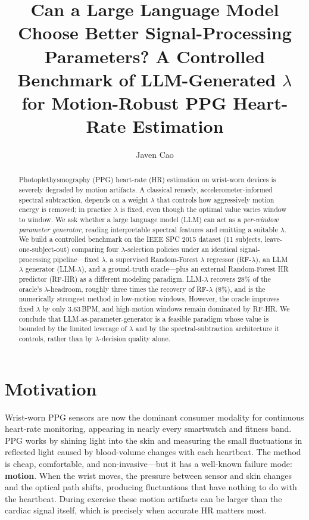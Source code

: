 \documentclass[sigconf,nonacm,11pt]{acmart}
\title{Can a Large Language Model Choose Better Signal-Processing Parameters? A Controlled Benchmark of LLM-Generated $\lambda$ for Motion-Robust PPG Heart-Rate Estimation}
\author{Javen Cao}
\affiliation{%
  \institution{University of California, San Diego}
  \city{La Jolla}
  \state{California}
  \country{USA}
}
\begin{document}
\begin{abstract}
Photoplethysmography (PPG) heart-rate (HR) estimation on wrist-worn devices is severely degraded by motion artifacts. A classical remedy, accelerometer-informed spectral subtraction, depends on a weight $\lambda$ that controls how aggressively motion energy is removed; in practice $\lambda$ is fixed, even though the optimal value varies window to window. We ask whether a large language model (LLM) can act as a \emph{per-window parameter generator}, reading interpretable spectral features and emitting a suitable $\lambda$. We build a controlled benchmark on the IEEE SPC 2015 dataset (11 subjects, leave-one-subject-out) comparing four $\lambda$-selection policies under an identical signal-processing pipeline---fixed $\lambda$, a supervised Random-Forest $\lambda$ regressor (RF-$\lambda$), an LLM $\lambda$ generator (LLM-$\lambda$), and a ground-truth oracle---plus an external Random-Forest HR predictor (RF-HR) as a different modeling paradigm. LLM-$\lambda$ recovers 28\% of the oracle's $\lambda$-headroom, roughly three times the recovery of RF-$\lambda$ (8\%), and is the numerically strongest method in low-motion windows. However, the oracle improves fixed $\lambda$ by only 3.63\,BPM, and high-motion windows remain dominated by RF-HR. We conclude that LLM-as-parameter-generator is a feasible paradigm whose value is bounded by the limited leverage of $\lambda$ and by the spectral-subtraction architecture it controls, rather than by $\lambda$-decision quality alone.
\end{abstract}

\maketitle

\section{Motivation}

Wrist-worn PPG sensors are now the dominant consumer modality for continuous heart-rate monitoring, appearing in nearly every smartwatch and fitness band. PPG works by shining light into the skin and measuring the small fluctuations in reflected light caused by blood-volume changes with each heartbeat. The method is cheap, comfortable, and non-invasive---but it has a well-known failure mode: \textbf{motion}. When the wrist moves, the pressure between sensor and skin changes and the optical path shifts, producing fluctuations that have nothing to do with the heartbeat. During exercise these motion artifacts can be larger than the cardiac signal itself, which is precisely when accurate HR matters most.
\end{document}
